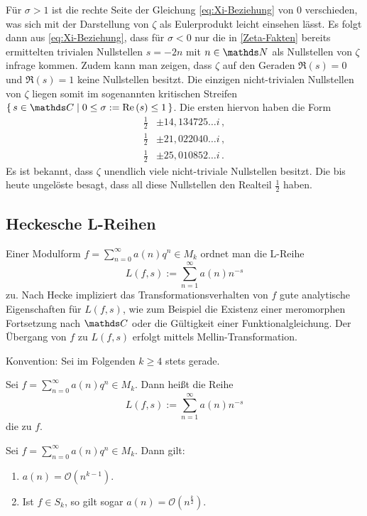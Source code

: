 Für $\sigma > 1$ ist die rechte Seite der Gleichung \eqref{eq:Xi-Beziehung} von $0$ verschieden, was sich mit der Darstellung von $\zeta$ als Eulerprodukt leicht einsehen lässt. Es folgt dann aus \eqref{eq:Xi-Beziehung}, dass für $\sigma < 0$ nur die in \autoref{Zeta-Fakten} bereits ermittelten \glqq{}trivialen Nullstellen\grqq{} $s = -2n$ mit $n \in \NN$ als Nullstellen von $\zeta$ infrage kommen. Zudem kann man zeigen, dass $\zeta$ auf den Geraden $\Re(s) = 0$ und $\Re(s) = 1$ keine Nullstellen besitzt. Die einzigen \glqq{}nicht-trivialen\grqq{} Nullstellen von $\zeta$ liegen somit im sogenannten \glqq{}kritischen Streifen\grqq{} $\Set {s \in \CC \mid 0 \leq \sigma := \Re(s) \leq 1}$. Die \glqq{}ersten\grqq{} hiervon haben die Form
\begin{align*}
	\tfrac 12 &\pm 14,134725\ldots i \,, \\
	\tfrac 12 &\pm 21,022040\ldots i \,, \\
	\tfrac 12 &\pm 25,010852\ldots i \,.
\end{align*}
Es ist bekannt, dass $\zeta$ unendlich viele nicht-triviale Nullstellen besitzt. Die bis heute ungelöste  besagt, dass all diese Nullstellen den Realteil $\frac 12$ haben.

\subsection{Heckesche L-Reihen}

Einer Modulform $f = \sum_{n=0}^\infty a(n) q^n \in M_k$ ordnet man die L-Reihe
\[
	L(f,s) := \sum_{n=1}^\infty a(n)n^{-s}
\]
zu. Nach Hecke impliziert das Transformationsverhalten von $f$ \glqq{}gute\grqq{} analytische Eigenschaften für $L(f,s)$, wie zum Beispiel die Existenz einer meromorphen Fortsetzung nach $\CC$ oder die Gültigkeit einer Funktionalgleichung. Der Übergang von $f$ zu $L(f,s)$ erfolgt mittels Mellin-Transformation.

Konvention: Sei im Folgenden $k \geq 4$ stets gerade. 

\begin{defi}
Sei $f = \sum_{n=0}^\infty a(n) q^n \in M_k$. Dann heißt die Reihe 
\[
	L(f,s) := \sum_{n=1}^\infty a(n)n^{-s}
\]
die  zu $f$. 
\end{defi}

\begin{satz}
Sei $f = \sum_{n=0}^\infty a(n) q^n \in M_k$. Dann gilt:
\begin{enumerate}
\item $a(n) = \mathcal O(n^{k-1})$.
\item Ist $f \in S_k$, so gilt sogar $a(n) = \mathcal O(n^{\frac k2})$.
\end{enumerate}
\end{satz}

